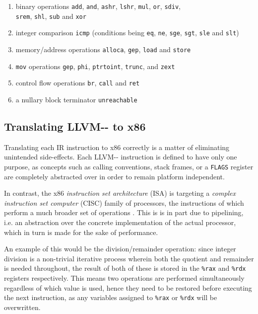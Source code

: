 \documentclass{article}
\begin{document}
\label{appendix:llvmis}
\begin{enumerate}
    \item binary operations \lstinline!add!, \lstinline!and!, \lstinline!ashr!, \lstinline!lshr!, \lstinline!mul!, \lstinline!or!, \lstinline!sdiv!,\\\lstinline!srem!, \lstinline!shl!, \lstinline!sub! and \lstinline!xor!
    \item integer comparison \lstinline!icmp! (conditions being \lstinline!eq!, \lstinline!ne!, \lstinline!sge!, \lstinline!sgt!, \lstinline!sle! and \lstinline!slt!)
    \item memory/address operations \lstinline!alloca!, \lstinline!gep!, \lstinline!load! and \lstinline!store!
    \item  \lstinline!mov! operations \lstinline!gep!, \lstinline!phi!, \lstinline!ptrtoint!, \lstinline!trunc!, and \lstinline!zext!
    \item control flow operations \lstinline!br!, \lstinline!call! and \lstinline!ret!
    \item a  nullary block terminator \lstinline!unreachable!
\end{enumerate}

\subsection{Translating LLVM-{}- to x86}

Translating each IR instruction to x86 correctly is a matter of eliminating unintended side-effects. Each LLVM-{}- instruction is defined to have only one purpose, %
as concepts such as calling conventions, stack frames, or a \lstinline!FLAGS! register are completely abstracted over in order to remain platform independent.

In contrast, the x86 \textit{instruction set architecture} (ISA) is targeting a  \textit{complex instruction set computer} (CISC) family of processors, the instructions of which perform a much broader set of operations \cite[p.~190]{tiger}. This is is in part due to pipelining, i.e. an abstraction over the concrete implementation of the actual processor, which in turn is made for the sake of performance.

An example of this would be the division/remainder operation: since integer division is a non-trivial iterative process wherein both the quotient and remainder is needed throughout, the result of both of these is stored in the \lstinline!%rax! and \lstinline!%rdx! registers respectively. This means two operations are performed simultaneously regardless of which value is used, hence they need to be restored before executing the next instruction, as any variables assigned to \lstinline!%rax! or \lstinline!%rdx! will be overwritten.
\end{document}
